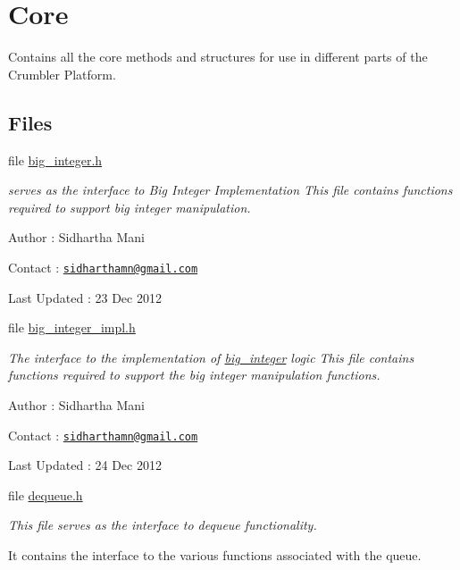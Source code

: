 \hypertarget{group__core}{\section{Core}
\label{group__core}
}


Contains all the core methods and structures for use in different parts of the Crumbler Platform.  


\subsection*{Files}
\begin{DoxyCompactItemize}
\item 
file \hyperlink{big__integer_8h}{big\-\_\-integer.\-h}
\begin{DoxyCompactList}\small\item\em serves as the interface to Big Integer Implementation This file contains functions required to support big integer manipulation.\par
 Author \-: Sidhartha Mani\par
 Contact \-: \href{mailto:sidharthamn@gmail.com}{\tt sidharthamn@gmail.\-com} \par
 Last Updated \-: 23 Dec 2012 \par
 \end{DoxyCompactList}\item 
file \hyperlink{big__integer__impl_8h}{big\-\_\-integer\-\_\-impl.\-h}
\begin{DoxyCompactList}\small\item\em The interface to the implementation of \hyperlink{big__integer__impl_8h_structbig__integer}{big\-\_\-integer} logic This file contains functions required to support the big integer manipulation functions.\par
 Author \-: Sidhartha Mani\par
 Contact \-: \href{mailto:sidharthamn@gmail.com}{\tt sidharthamn@gmail.\-com} \par
 Last Updated \-: 24 Dec 2012 \par
 \end{DoxyCompactList}\item 
file \hyperlink{dequeue_8h}{dequeue.\-h}
\begin{DoxyCompactList}\small\item\em This file serves as the interface to dequeue functionality. \par
 It contains the interface to the various functions associated with the queue.\par

\end{DoxyCompactList}
\end{DoxyCompactItemize}
